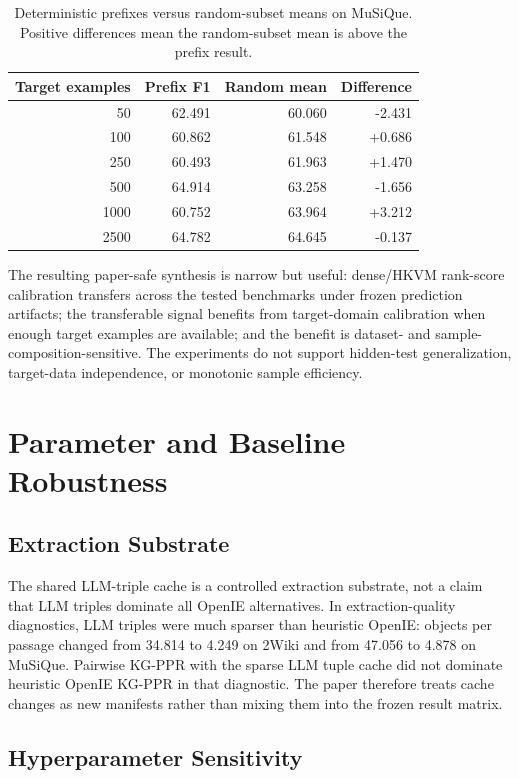 \documentclass[conference]{IEEEtran}
\begin{document}
\begin{table}[t]
\caption{Deterministic prefixes versus random-subset means on MuSiQue. Positive differences mean the random-subset mean is above the prefix result.}
\label{tab:supp_p2b_prefix_random}
\centering
\scriptsize
\begin{tabular}{rrrr}
\toprule
Target examples & Prefix F1 & Random mean & Difference \\
\midrule
50 & 62.491 & 60.060 & -2.431 \\
100 & 60.862 & 61.548 & +0.686 \\
250 & 60.493 & 61.963 & +1.470 \\
500 & 64.914 & 63.258 & -1.656 \\
1000 & 60.752 & 63.964 & +3.212 \\
2500 & 64.782 & 64.645 & -0.137 \\
\bottomrule
\end{tabular}
\end{table}

The resulting paper-safe synthesis is narrow but useful: dense/HKVM rank-score calibration transfers across the tested benchmarks under frozen prediction artifacts; the transferable signal benefits from target-domain calibration when enough target examples are available; and the benefit is dataset- and sample-composition-sensitive. The experiments do not support hidden-test generalization, target-data independence, or monotonic sample efficiency.

\section{Parameter and Baseline Robustness}

\subsection{Extraction Substrate}

The shared LLM-triple cache is a controlled extraction substrate, not a claim that LLM triples dominate all OpenIE alternatives. In extraction-quality diagnostics, LLM triples were much sparser than heuristic OpenIE: objects per passage changed from 34.814 to 4.249 on 2Wiki and from 47.056 to 4.878 on MuSiQue. Pairwise KG-PPR with the sparse LLM tuple cache did not dominate heuristic OpenIE KG-PPR in that diagnostic. The paper therefore treats cache changes as new manifests rather than mixing them into the frozen result matrix.

\subsection{Hyperparameter Sensitivity}
\end{document}
